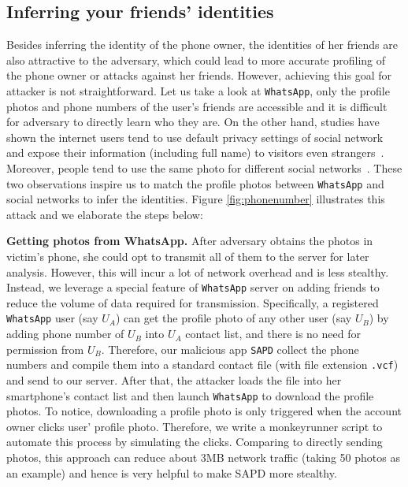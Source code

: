 \documentclass{sig-alternate}
\begin{document}
\begin{figure}[ht]
\end{figure}


\subsection{Inferring your friends' identities}
\label{sec:attack2}


Besides inferring the identity of the phone owner, the identities of her friends are also attractive to the adversary, which could lead to more accurate profiling of the phone owner or attacks against her friends. However, achieving this goal for attacker is not straightforward. Let us take a look at \texttt{WhatsApp}, only the profile photos and phone numbers of the user's friends are accessible and it is difficult for adversary to directly learn who they are. On the other hand, studies have shown the internet users tend to use default privacy settings of social network and expose their information (including full name) to visitors even strangers~\cite{SocialMediaPrivacy}. Moreover, people tend to use the same photo for different social networks~\cite{SameProfilePicture}. These two observations inspire us to match the profile photos between \texttt{WhatsApp} and social networks to infer the identities. Figure \ref{fig:phonenumber} illustrates this attack and we elaborate the steps below:


\vspace{2pt}\noindent\textbf{Getting photos from WhatsApp.}
After adversary obtains the photos in victim's phone, she could opt to transmit all of them to the server for later analysis. However, this will incur a lot of network overhead and is less stealthy. Instead, we leverage a special feature of \texttt{WhatsApp} server on adding friends to reduce the volume of data required for transmission. Specifically, a registered \texttt{WhatsApp} user (say $U_A$) can get the profile photo of any other user (say $U_B$) by adding phone number of $U_B$ into $U_A$ contact list, and there is no need for permission from $U_B$. Therefore, our malicious app \texttt{SAPD} collect the phone numbers and compile them into a standard contact file (with file extension \texttt{.vcf}) and send to our server. After that, the attacker loads the file into her smartphone's contact list and then launch \texttt{WhatsApp} to download the profile photos. To notice, downloading a profile photo is only triggered when the account owner clicks user' profile photo. Therefore, we write a monkeyrunner script to automate this process by simulating the clicks. Comparing to directly sending photos, this approach can reduce about 3MB network traffic (taking 50 photos as an example) and hence is very helpful to make SAPD more stealthy.
\end{document}
